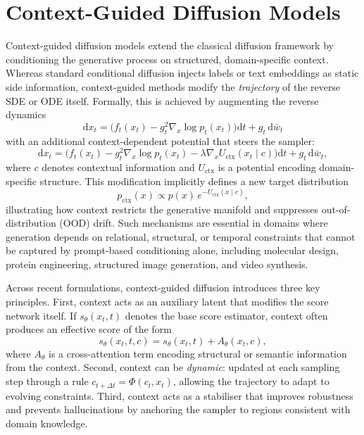 \section{Context-Guided Diffusion Models}
\label{sec:context_guided_diffusion}
Context-guided diffusion models extend the classical diffusion framework by
conditioning the generative process on structured, domain-specific context.
Whereas standard conditional diffusion injects labels or text embeddings as
static side information, context-guided methods modify the \emph{trajectory} of
the reverse SDE or ODE itself. Formally, this is achieved by augmenting the
reverse dynamics
\[
\mathrm{d}x_t = 
\Big(f_t(x_t) - g_t^2 \nabla_x \log p_t(x_t)\Big)\mathrm{d}t + g_t\,\mathrm{d}\bar{w}_t
\]
with an additional context-dependent potential that steers the sampler:
\[
\mathrm{d}x_t
=
\Big(
f_t(x_t)
- g_t^2 \nabla_x \log p_t(x_t)
- \lambda \nabla_x U_{\mathrm{ctx}}(x_t \mid c)
\Big)\mathrm{d}t
+ g_t\, \mathrm{d}\bar{w}_t,
\]
where $c$ denotes contextual information and $U_{\mathrm{ctx}}$ is a potential
encoding domain-specific structure. This modification implicitly defines a new
target distribution
\[
p_{\mathrm{ctx}}(x) \propto p(x)\,e^{-U_{\mathrm{ctx}}(x\mid c)},
\]
illustrating how context restricts the generative manifold and suppresses
out-of-distribution (OOD) drift. Such mechanisms are essential in domains where
generation depends on relational, structural, or temporal constraints that
cannot be captured by prompt-based conditioning alone, including molecular
design, protein engineering, structured image generation, and video synthesis.

Across recent formulations, context-guided diffusion introduces three key
principles. First, context acts as an auxiliary latent that modifies the score
network itself. If $s_\theta(x_t,t)$ denotes the base score estimator, context
often produces an effective score of the form
\[
s_\theta(x_t,t,c)
=
s_\theta(x_t,t)
+
A_\theta(x_t,c),
\]
where $A_\theta$ is a cross-attention term encoding structural or semantic
information from the context. Second, context can be \emph{dynamic}: updated at
each sampling step through a rule $c_{t+\Delta t} = \Phi(c_t, x_t)$, allowing the
trajectory to adapt to evolving constraints. Third, context acts as a stabiliser
that improves robustness and prevents hallucinations by anchoring the sampler to
regions consistent with domain knowledge.


